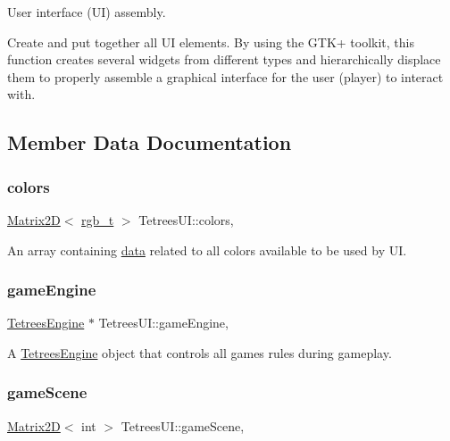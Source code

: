 User interface (UI) assembly. 

Create and put together all UI elements. By using the G\+T\+K+ toolkit, this function creates several widgets from different types and hierarchically displace them to properly assemble a graphical interface for the user (player) to interact with. 

\subsection{Member Data Documentation}
\mbox{\label{classTetreesUI_a57300c1925cb5ae34c9220cd993e28b2}} 
\subsubsection{\texorpdfstring{colors}{colors}}
{\footnotesize\ttfamily \mbox{\hyperlink{classMatrix2D}{Matrix2D}}$<$ \mbox{\hyperlink{structrgb__t}{rgb\+\_\+t}} $>$ Tetrees\+U\+I\+::colors\hspace{0.3cm}{\ttfamily [static]}, {\ttfamily [private]}}

An array containing \mbox{\hyperlink{structrgb__t}{data}} related to all colors available to be used by UI. \mbox{\label{classTetreesUI_a07faa56ea40b28beba7509fa7f65c897}} 
\subsubsection{\texorpdfstring{game\+Engine}{gameEngine}}
{\footnotesize\ttfamily \mbox{\hyperlink{classTetreesEngine}{Tetrees\+Engine}} $\ast$ Tetrees\+U\+I\+::game\+Engine\hspace{0.3cm}{\ttfamily [static]}, {\ttfamily [private]}}

A \mbox{\hyperlink{classTetreesEngine}{Tetrees\+Engine}} object that controls all game\textquotesingle{}s rules during gameplay. \mbox{\label{classTetreesUI_a604cf4cecdbc93745eaf7733b3c33602}} 
\subsubsection{\texorpdfstring{game\+Scene}{gameScene}}
{\footnotesize\ttfamily \mbox{\hyperlink{classMatrix2D}{Matrix2D}}$<$ int $>$ Tetrees\+U\+I\+::game\+Scene\hspace{0.3cm}{\ttfamily [static]}, {\ttfamily [private]}}

